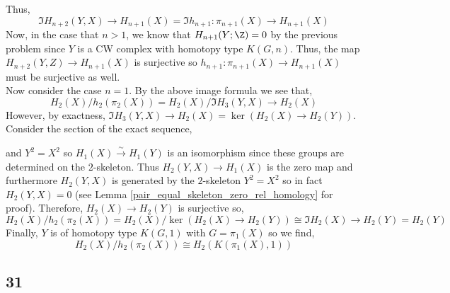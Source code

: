 \documentclass[12pt]{extarticle}
\begin{document}
Thus, 
\[ \Im{H_{n+2}(Y, X) \to H_{n+1}(X)} = \Im{h_{n+1} : \pi_{n+1}(X) \to H_{n+1}(X)} \]
Now, in the case that $n > 1$, we know that $H_{n+1}(Y ; \Z) = 0$ by the previous problem since $Y$ is a CW complex with homotopy type $K(G, n)$. Thus, the map $H_{n+2}(Y, Z) \to H_{n+1}(X)$ is surjective so $h_{n+1} : \pi_{n+1}(X) \to H_{n+1}(X)$ must be surjective as well. 
\bigskip\\
Now consider the case $n = 1$. By the above image formula we see that, 
\[ H_2(X) / h_2(\pi_2(X)) =  H_2(X) / \Im{H_{3}(Y, X) \to H_{2}(X)} \]
However, by exactness, $\Im{H_3(Y, X) \to H_{2}(X)} = \ker{(H_{2}(X) \to H_{2}(Y))}$. 
Consider the section of the exact sequence,
\begin{center}
\end{center}
and $Y^2 = X^2$ so $H_1(X) \xrightarrow{\sim} H_1(Y)$ is an isomorphism since these groups are determined on the $2$-skeleton. Thus $H_{2}(Y, X) \to H_1(X)$ is the zero map and furthermore $H_2(Y, X)$ is generated by the $2$-skeleton $Y^2 = X^2$ so in fact $H_2(Y, X) = 0$ (see Lemma \ref{pair_equal_skeleton_zero_rel_homology} for proof). Therefore, $H_2(X) \to H_2(Y)$ is surjective so,
\[  H_2(X) / h_2(\pi_2(X)) = H_2(X) / \ker{(H_2(X) \to H_{2}(Y))} \cong \Im{H_2(X) \to H_{2}(Y)} = H_2(Y) \]
Finally, $Y$ is of homotopy type $K(G, 1)$ with $G = \pi_1(X)$ so we find,
\[ H_2(X) / h_2(\pi_2(X)) \cong H_2(K(\pi_1(X), 1)) \]

\subsection{31}
\end{document}

